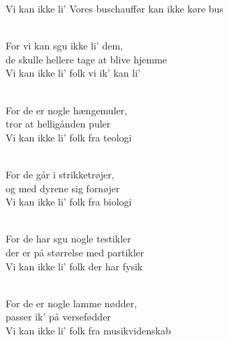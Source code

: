 \begin{song}{Vi kan ikke li'}
  {} %
  {Vores buschauffør kan ikke køre bus} %
  {} %
  {} %
  {\NotCCLIed} %

 \begin{SBVerse}
    \\
    For vi kan sgu ikke li' dem,\\
    de skulle hellere tage at blive hjemme\\
    Vi kan ikke li' folk vi ik' kan li'
  \end{SBVerse}

  \begin{SBVerse}
    \\
    For de er nogle hængemuler,\\
    tror at helligånden puler\\
    Vi kan ikke li' folk fra teologi
  \end{SBVerse}

  \begin{SBVerse}
    \\
    For de går i strikketrøjer,\\
    og med dyrene sig fornøjer\\
    Vi kan ikke li' folk fra biologi
  \end{SBVerse}

  \begin{SBVerse}
    \\
    For de har sgu nogle testikler\\
    der er på størrelse med partikler\\
    Vi kan ikke li' folk der har fysik
  \end{SBVerse}

  \begin{SBVerse}
    \\
    For de er nogle lamme nødder,\\
    passer ik' på versefødder\\
    Vi kan ikke li' folk fra musikvidenskab
  \end{SBVerse}


\end{song}
